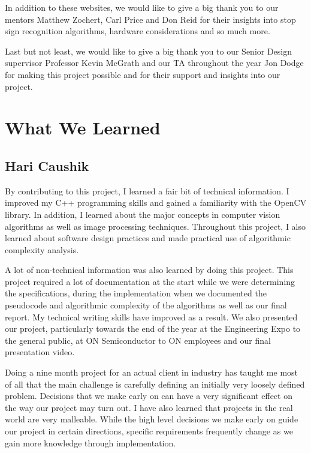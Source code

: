 \documentclass[letterpaper,10pt,titlepage]{article}
\begin{document}
In addition to these websites, we would like to give a big thank you to our 
mentors Matthew Zochert, Carl Price and Don Reid for their insights into 
stop sign recognition algorithms, hardware considerations and so much more. 

Last but not least, we would like to give a big thank you to our Senior Design
supervisor Professor Kevin McGrath and our TA throughout the year Jon Dodge for
making this project possible and for their support and insights into our 
project. 

\section*{What We Learned}
\subsection*{Hari Caushik}
By contributing to this project, I learned a fair bit of technical information. 
I improved my C++ programming skills and gained a familiarity with the OpenCV
library. In addition, I learned about the major concepts in computer vision
algorithms as well as image processing techniques. Throughout this project, I
also learned about software design practices and made practical use of
algorithmic complexity analysis.

A lot of non-technical information was also learned by doing this project. This
project required a lot of documentation at the start while we were 
determining the specifications, during the implementation when we documented 
the pseudocode and algorithmic complexity of the algorithms as well as our 
final report. My technical writing skills have improved as a result. We also 
presented our project, particularly towards the end of the year at the 
Engineering Expo to the general public, at ON Semiconductor to ON employees and
our final presentation video. 

Doing a nine month project for an actual client in industry has taught me most
of all that the main challenge is carefully defining an initially very 
loosely defined problem. Decisions that we make early on can have a very 
significant effect on the way our project may turn out. I have also learned 
that projects in the real world are very malleable. While the high level 
decisions we make early on guide our project in certain directions, specific 
requirements frequently change as we gain more knowledge through 
implementation. 
\end{document}

